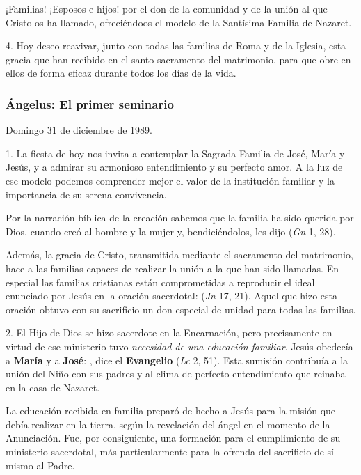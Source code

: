 \begin{body}
\begin{body}
¡Familias! ¡Esposos e hijos!  por el don de la comunidad y de la unión al que Cristo os ha llamado, ofreciéndoos el modelo de la Santísima Familia de Nazaret.

4. Hoy deseo reavivar, junto con todas las familias de Roma y de la Iglesia, esta gracia que han recibido en el santo sacramento del matrimonio, para que obre en ellos de forma eficaz durante todos los días de la vida.

\subsubsection{Ángelus: El primer seminario}

Domingo 31 de diciembre de 1989.

1. La fiesta de hoy nos invita a contemplar la Sagrada Familia de José, María y Jesús, y a admirar su armonioso entendimiento y su perfecto amor. A la luz de ese modelo podemos comprender mejor el valor de la institución familiar y la importancia de su serena convivencia.

Por la narración bíblica de la creación sabemos que la familia ha sido querida por Dios, cuando creó al hombre y la mujer y, bendiciéndolos, les dijo  (\emph{Gn} 1, 28).

Además, la gracia de Cristo, transmitida mediante el sacramento del matrimonio, hace a las familias capaces de realizar la unión a la que han sido llamadas. En especial las familias cristianas están comprometidas a reproducir el ideal enunciado por Jesús en la oración sacerdotal:  (\emph{Jn} 17, 21). Aquel que hizo esta oración obtuvo con su sacrificio un don especial de unidad para todas las familias.

2. El Hijo de Dios se hizo sacerdote en la Encarnación, pero precisamente en virtud de ese ministerio tuvo \emph{necesidad de una educación familiar}. Jesús obedecía a \textbf{María} y a \textbf{José}: , dice el \textbf{Evangelio} (\emph{Lc} 2, 51). Esta sumisión contribuía a la unión del Niño con sus padres y al clima de perfecto entendimiento que reinaba en la casa de Nazaret.

La educación recibida en familia preparó de hecho a Jesús para la misión que debía realizar en la tierra, según la revelación del ángel en el momento de la Anunciación. Fue, por consiguiente, una formación para el cumplimiento de su ministerio sacerdotal, más particularmente para la ofrenda del sacrificio de sí mismo al Padre.


\end{body}
\end{body}
